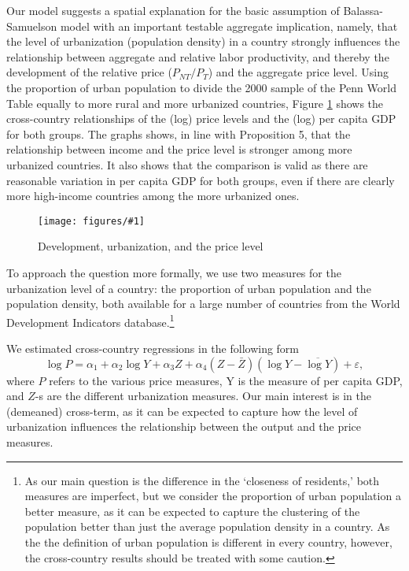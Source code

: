 \documentclass[12pt]{article}
\newcommand{\dofigure}[2]{\begin{figure}
\begin{centering}
\texttt{[image: figures/\#1]}
  \caption{#2\label{fig:#1}}
\end{centering}
\end{figure}}
\begin{document}
Our model suggests a spatial explanation for the basic assumption of Balassa-Samuelson model with an important testable aggregate implication, namely, that the level of urbanization (population density) in a country strongly influences the relationship between aggregate and relative labor productivity, and thereby the development of the relative price ($P_{NT}/P_T$) and the aggregate price level. Using the proportion of urban population to divide the 2000 sample of the Penn World Table equally to more rural and more urbanized countries, Figure \ref{fig:sc_penn} shows the cross-country relationships of the (log) price levels and the (log) per capita GDP for both groups. The graphs shows, in line with Proposition 5,
that the relationship between income and the price level is stronger
among more urbanized countries. It also shows that the comparison is
valid as there are reasonable variation in per capita GDP for both
groups, even if there are clearly more high-income countries among
the more urbanized ones.

\dofigure{sc_penn}{Development, urbanization, and the price level}

To approach the question more formally, we use two measures for the urbanization level of a country: the proportion of urban population and the population density, both available for a large number of countries from the World Development Indicators database.\footnote{As our main question is the difference in the `closeness of residents,' both measures are imperfect, but we consider the proportion of urban population a better measure, as it can be expected to capture the clustering of the population better than just the average population density in a country. As the the definition of urban population is different in every country, however, the cross-country results should be treated with some caution.}

We estimated cross-country regressions in the following form
\begin{equation}
\log{P}=\alpha_1+\alpha_2\log Y+\alpha_3Z+\alpha_4(Z-\bar{Z})(\log Y-\overline{\log Y})+\varepsilon,
\end{equation}
where $P$ refers to the various price measures, Y is the measure of per capita GDP, and $Z$-s are the different urbanization measures. Our main
interest is in the (demeaned) cross-term, as it can be expected to
capture how the level of urbanization influences the relationship
between the output and the price measures.
\end{document}

